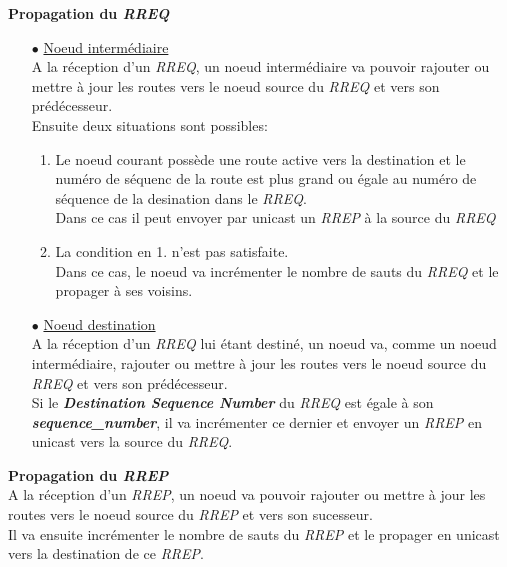 \documentclass[a4paper, 12pt]{report}
\begin{document}
            \textbf{Propagation du \textit{RREQ}}\\
        \begin{itemize}
            \item[$\bullet$] \underline{Noeud intermédiaire}\\
                A la réception d'un \textit{RREQ}, un noeud intermédiaire va pouvoir rajouter ou mettre à jour
                les routes vers le noeud source du \textit{RREQ} et vers son prédécesseur.\\
                Ensuite deux situations sont possibles:
                \begin{enumerate}
                    \item Le noeud courant possède une route active vers la destination et le numéro de séquenc de la route est plus grand ou égale au numéro de séquence
                        de la desination dans le \textit{RREQ}.\\
                        Dans ce cas il peut envoyer par unicast un \textit{RREP} à la source du \textit{RREQ}
                    \item La condition en 1. n'est pas satisfaite.\\
                        Dans ce cas, le noeud va incrémenter le nombre de sauts du \textit{RREQ} et le propager à ses voisins.\\
                \end{enumerate}
                

            \item[$\bullet$] \underline{Noeud destination}\\
                A la réception d'un \textit{RREQ} lui étant destiné, un noeud va, comme un noeud intermédiaire, 
                rajouter ou mettre à jour les routes vers le noeud source du \textit{RREQ} et vers son prédécesseur.\\
                Si le \textbf{\textit{Destination Sequence Number}} du \textit{RREQ} est égale à son \textbf{\textit{sequence\_number}},
                il va incrémenter ce dernier et envoyer un \textit{RREP} en unicast vers la source du \textit{RREQ}.\\
             
        \end{itemize}


        \textbf{Propagation du \textit{RREP}}\\
            A la réception d'un \textit{RREP}, un noeud va pouvoir rajouter ou mettre à jour
            les routes vers le noeud source du \textit{RREP} et vers son sucesseur.\\
            Il va ensuite incrémenter le nombre de sauts du \textit{RREP} et le propager en unicast vers la destination de ce \textit{RREP}.\\
\end{document}
